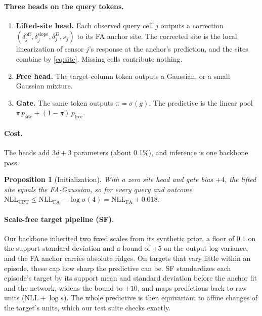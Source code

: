 \documentclass{article}
\newtheorem{proposition}{Proposition}
\newcommand{\NLL}{\mathrm{NLL}}
\begin{document}
\paragraph{Three heads on the query tokens.}
\begin{enumerate}
  \item \textbf{Lifted-site head.} Each observed query cell $j$ outputs a correction
  $(\delta^{\mathrm{off}}_j,\delta^{\mathrm{slope}}_j,\delta^{D}_j,s_j)$ to its FA anchor site. The corrected site is
  the local linearization of sensor $j$'s response at the anchor's prediction, and the sites combine by
  \eqref{eq:site}. Missing cells contribute nothing.
  \item \textbf{Free head.} The target-column token outputs a Gaussian, or a small Gaussian mixture.
  \item \textbf{Gate.} The same token outputs $\pi=\sigma(g)$. The predictive is the linear pool
  $\pi\,p_{\mathrm{site}}+(1-\pi)\,p_{\mathrm{free}}$.
\end{enumerate}

\paragraph{Cost.} The heads add $3d+3$ parameters (about 0.1\%), and inference is one backbone pass.

\begin{proposition}[Initialization]\label{prop:init}
With a zero site head and gate bias $+4$, the lifted site equals the FA-Gaussian, so for every query and outcome
$\NLL_{\mathrm{UPT}}\leq\NLL_{\mathrm{FA}}-\log\sigma(4)=\NLL_{\mathrm{FA}}+0.018$.
\end{proposition}

\paragraph{Scale-free target pipeline (SF).} Our backbone inherited two fixed scales from its synthetic prior, a floor
of $0.1$ on the support standard deviation and a bound of $\pm5$ on the output log-variance, and the FA anchor carries
absolute ridges. On targets that vary little within an episode, these cap how sharp the predictive can be. SF
standardizes each episode's target by its support mean and standard deviation before the anchor fit and the network,
widens the bound to $\pm10$, and maps predictions back to raw units ($\NLL+\log s$). The whole predictive is then
equivariant to affine changes of the target's units, which our test suite checks exactly.
\end{document}
